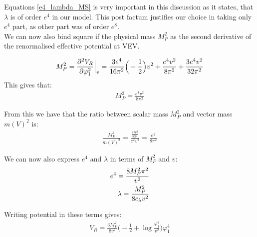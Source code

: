 Equations \ref{e4_lambda_MS} is very important in this discussion as it states, that $\lambda$ 
is of order $e^4$ in our model. This post factum justifies our 
choice in taking only $e^4$ part, as other part was of order $e^8$. \\

We can now also bind square if the physical mass $M_P^2$ as the second derivative of the 
renormalised effective potential at VEV.

\begin{align}
M_P^2 = \frac{\partial^2 V_R}{\partial \varphi_1^2} \Big|_v = \frac{3e^4}{16\pi^2}\Big(-\frac{1}{2}\Big)v^2+\frac{e^4v^2}{8\pi^2} 
+\frac{3e^4v^2}{32\pi^2}
\end{align}
This gives that:
\begin{align}
M_P^2 = \frac{e^4v^2}{8\pi^2}
\end{align}

From this we have that the ratio between scalar mass $M_P^2$ and vector mass $m(V)^2$ is:
\begin{align}
\frac{M_P^2}{m(V)^2} = \frac{\frac{e^4v^2}{8\pi^2}}{e^2v^2} = \frac{e^2}{8\pi^2}
\end{align}

We can now also express $e^4$ and $\lambda$ in terms of $M_P^2$ and $v$:
\begin{align}
e^4 = \frac{8M_P^2\pi^2}{v^2} \\
\lambda = \frac{M_P^2}{8c_\lambda v^2}
\end{align}

Writing potential in these terms gives:
\begin{align}
V_R = \frac{3M_P^2}{8v^2}\Big(-\frac{1}{2}+\log\frac{\varphi_1^2}{v^2}\Big)\varphi_1^4
\end{align}


